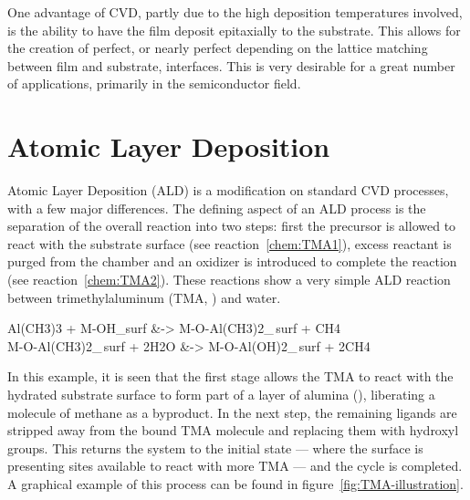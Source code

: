 One advantage of CVD, partly due to the high deposition temperatures involved, is the ability to have the film deposit epitaxially to the substrate. This allows for the creation of perfect, or nearly perfect depending on the lattice matching between film and substrate, interfaces. This is very desirable for a great number of applications, primarily in the semiconductor field. 


\section{Atomic Layer Deposition}
\label{sec:Synth-ALD}
	
Atomic Layer Deposition (ALD) is a modification on standard CVD processes, with a few major differences. The defining aspect of an ALD process is the separation of the overall reaction into two steps: first the precursor is allowed to react with the substrate surface (see reaction~\ref{chem:TMA1}), excess reactant is purged from the chamber and an oxidizer is introduced to complete the reaction (see reaction~\ref{chem:TMA2}). These reactions show a very simple ALD reaction between trimethylaluminum (TMA, ) and water. 

\begin{reactions}
	Al(CH3)3 + M-OH_{surf} &-> M-O-Al(CH3)2_{\,surf} + CH4 \label{chem:TMA1}%
		\\
	M-O-Al(CH3)2_{\,surf} + 2H2O &-> M-O-Al(OH)2_{\,surf} + 2CH4 \label{chem:TMA2}%
\end{reactions}


In this example, it is seen that the first stage allows the TMA to react with the hydrated substrate surface to form part of a layer of alumina (), liberating a molecule of methane as a byproduct. In the next step, the remaining ligands are stripped away from the bound TMA molecule and replacing them with hydroxyl groups. This returns the system to the initial state --- where the surface is presenting sites available to react with more TMA --- and the cycle is completed. A graphical example of this process can be found in figure~\ref{fig:TMA-illustration}.


